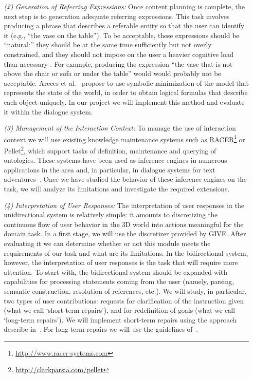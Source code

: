 \emph{(2) Generation of Referring Expressions:} Once content planning is
complete, the next step is to generation adequate referring expressions. 
This task involves producing a phrase that describes a referable entity so that the user can
identify it (e.g., ``the vase on the table''). To be
acceptable, these expressions should be ``natural:'' they should be at the same time
sufficiently but not overly constrained, and they should not impose on the user a heavier 
cognitive load than necessary . For example, producing the expression 
``the vase that is not above the chair or sofa or under the
table'' would would probably not be acceptable. Areces et al.~ propose to
use symbolic minimization of the model that represents the state of the world, in
order to obtain logical formulas that describe each object uniquely. In our
project we will implement this method and evaluate it within the dialogue system.

\emph{(3) Management of the Interaction Context:} To manage the use of
interaction context we will use existing knowledge maintenance systems such as
RACER\footnote{\url{http://www.racer-systems.com}} or Pellet\footnote{\url{http://clarkparsia.com/pellet}}, which support tasks of
definition, maintenance and querying of ontologies. These systems have been used
as inference engines in numerous applications in
the area and, in particular, in dialogue systems for text adventures~\cite{benotti09b}. Once we
have studied the behavior of these inference engines on the task, we will
analyze its limitations and investigate the required extensions.

\emph{(4) Interpretation of User Responses:} The interpretation of user
responses in the unidirectional system is relatively simple: it amounts to
discretizing the continuous flow of user behavior in the 3D world into actions
meaningful for the domain task. In a first
stage, we will use the discretizer provided by GIVE. After evaluating it we can
determine whether or not this module meets the requirements of
our task and what are its limitations. In the bidirectional system, however,
the interpretation of user responses is the task that will require more
attention.
To start with, the bidirectional system should be expanded with capabilities
for  processing statements coming from the user (namely, parsing, semantic
construction, resolution of references, etc.). We will study, in particular, two
types of user contributions: requests for clarification of the instruction
given (what we call `short-term repairs'), and for redefinition of goals (what we
call `long-term repairs'). We will implement short-term repairs
using the approach describe in~\cite{purver06}. For long-term repairs we will use the
guidelines of~\cite{blaylock05a}. 

